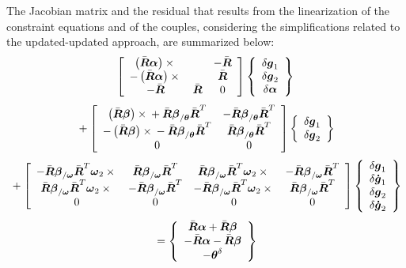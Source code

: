 \documentclass[10pt,dvips,fleqn]{report}
\newcommand{\T}[1]{\boldsymbol{#1}}
\begin{document}
\noindent
The Jacobian matrix and the residual that results from the linearization
of the constraint equations and of the couples, considering
the simplifications related to the updated-updated approach,
are summarized below:
\begin{equation}
	\sqbr{\matr{ccc}{
	\plbr{\bar{\T{R}}\T{\alpha}}\times{} & & - \bar{\T{R}} \\
	- \plbr{\bar{\T{R}}\T{\alpha}}\times{} & & \bar{\T{R}} \\
	- \bar{\T{R}} & \bar{\T{R}} & 0
	}}\cubr{\cvvect{
		\delta\T{g}_1 \\
		\delta\T{g}_2 \\
		\delta\T{\alpha} \\
	}}
\end{equation}
\begin{equation}
	\mbox{} + \sqbr{\matr{cc}{
	\plbr{\bar{\T{R}}\T{\beta}}\times{} 
		+ \bar{\T{R}}\T{\beta}_{/\T{\theta}}\bar{\T{R}}^T &
		- \bar{\T{R}}\T{\beta}_{/\T{\theta}}\bar{\T{R}}^T \\
	- \plbr{\bar{\T{R}}\T{\beta}}\times{}
		- \bar{\T{R}}\T{\beta}_{/\T{\theta}}\bar{\T{R}}^T &
		\bar{\T{R}}\T{\beta}_{/\T{\theta}}\bar{\T{R}}^T \\
	0 & 0 
	}}\cubr{\cvvect{
		\delta\T{g}_1 \\
		\delta\T{g}_2 \\
	}}
\end{equation}
\begin{equation}
 	\mbox{} + \sqbr{\matr{cccc}{
		- \bar{\T{R}}\T{\beta}_{/\T{\omega}}\bar{\T{R}}^T\T{\omega}_2\times{} &
		\bar{\T{R}}\T{\beta}_{/\T{\omega}}\bar{\T{R}}^T &
		\bar{\T{R}}\T{\beta}_{/\T{\omega}}\bar{\T{R}}^T\T{\omega}_2\times{} &
		- \bar{\T{R}}\T{\beta}_{/\T{\omega}}\bar{\T{R}}^T \\
		\bar{\T{R}}\T{\beta}_{/\T{\omega}}\bar{\T{R}}^T\T{\omega}_2\times{} &
		- \bar{\T{R}}\T{\beta}_{/\T{\omega}}\bar{\T{R}}^T &
		- \bar{\T{R}}\T{\beta}_{/\T{\omega}}\bar{\T{R}}^T\T{\omega}_2\times{} &
		\bar{\T{R}}\T{\beta}_{/\T{\omega}}\bar{\T{R}}^T \\
	0 & 0 & 0 & 0
	}}\cubr{\cvvect{
		\delta\T{g}_1 \\
		\delta\T{\dot{g}}_1 \\
		\delta\T{g}_2 \\
		\delta\T{\dot{g}}_2 \\
	}}
\end{equation}
\begin{equation}
 	\mbox{} = \cubr{\cvvect{
		\bar{\T{R}} \T{\alpha} + \bar{\T{R}} \T{\beta} \\
		- \bar{\T{R}} \T{\alpha} - \bar{\T{R}} \T{\beta} \\
		- \T{\theta}^{\delta}
	}}
\end{equation}
\end{document}
